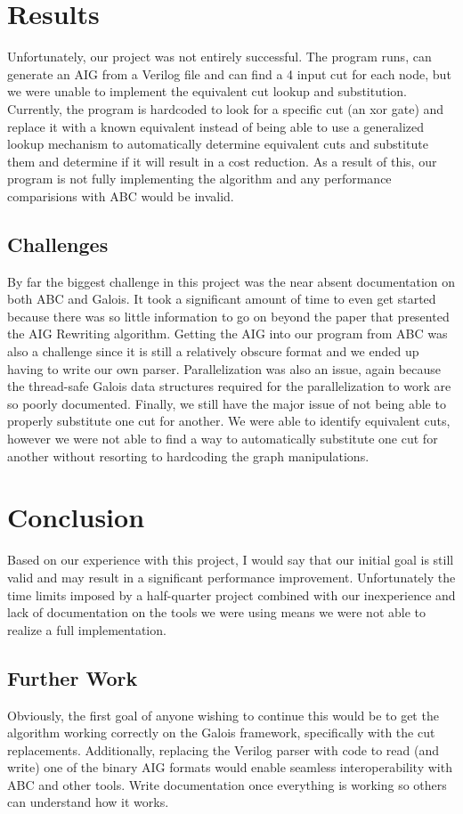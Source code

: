 \documentclass[twocolumn]{article}
\begin{document}
\section{Results}
Unfortunately, our project was not entirely successful. The program runs, can generate an AIG from a Verilog file and can find a 4 input cut for each node, but we were unable to implement the equivalent cut lookup and substitution. Currently, the program is hardcoded to look for a specific cut (an xor gate) and replace it with a known equivalent instead of being able to use a generalized lookup mechanism to automatically determine equivalent cuts and substitute them and determine if it will result in a cost reduction. As a result of this, our program is not fully implementing the algorithm and any performance comparisions with ABC would be invalid.
\subsection{Challenges}
By far the biggest challenge in this project was the near absent documentation on both ABC and Galois. It took a significant amount of time to even get started because there was so little information to go on beyond the paper that presented the AIG Rewriting algorithm. Getting the AIG into our program from ABC was also a challenge since it is still a relatively obscure format and we ended up having to write our own parser. Parallelization was also an issue, again because the thread-safe Galois data structures required for the parallelization to work are so poorly documented. Finally, we still have the major issue of not being able to properly substitute one cut for another. We were able to identify equivalent cuts, however we were not able to find a way to automatically substitute one cut for another without resorting to hardcoding the graph manipulations.
\section{Conclusion}
Based on our experience with this project, I would say that our initial goal is still valid and may result in a significant performance improvement. Unfortunately the time limits imposed by a half-quarter project combined with our inexperience and lack of documentation on the tools we were using means we were not able to realize a full implementation.\newline\indent
\subsection{Further Work}
Obviously, the first goal of anyone wishing to continue this would be to get the algorithm working correctly on the Galois framework, specifically with the cut replacements. Additionally, replacing the Verilog parser with code to read (and write) one of the binary AIG formats would enable seamless interoperability with ABC and other tools. Write documentation once everything is working so others can understand how it works.


\end{document}
